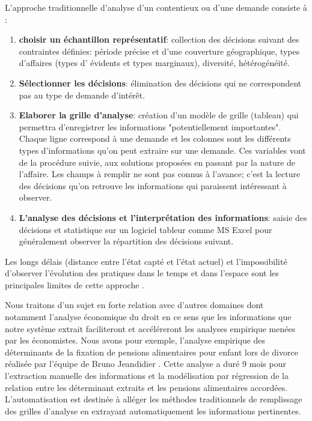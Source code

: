 L'approche traditionnelle d'analyse d'un contentieux ou d'une demande \citep{ancel2003expulsion} consiste à :
\begin{enumerate}
\item \textbf{choisir un échantillon représentatif}: collection des décisions suivant des contraintes définies:  période précise et d'une couverture géographique, types d'affaires (types d' évidents et types marginaux), diversité, hétérogénéité. 
\item \textbf{Sélectionner les décisions}: élimination des décisions qui ne correspondent pas au type de demande d'intérêt.
\item \textbf{Elaborer la grille d'analyse}: création d'un modèle de grille (tableau) qui permettra d'enregistrer les informations "potentiellement importantes". Chaque ligne correspond à une demande et les colonnes sont les différents types d'informations qu'on peut extraire sur une demande. Ces variables vont de la procédure suivie, aux solutions proposées en passant par la nature de l'affaire. Les champs à remplir ne sont pas connus à l'avance; c'est la lecture des décisions qu'on retrouve les informations qui paraissent intéressant à observer.
\item \textbf{L'analyse des décisions et l'interprétation des informations}: saisie des décisions et statistique sur un logiciel tableur comme MS Excel pour généralement observer la répartition des décisions suivant.
\end{enumerate}

Les longs délais (distance entre l'état capté et l'état actuel) et l'impossibilité d'observer l'évolution des pratiques dans le temps et dans l'espace sont les principales limites de cette approche \citep{ancel2003expulsion}.

Nous traitons d'un sujet en forte relation avec d'autres domaines dont notamment l'analyse économique du droit en ce sens que les informations que notre système extrait faciliteront et accéléreront les analyses empirique menées par les économistes. Nous avons pour exemple, l'analyse empirique des déterminants de la fixation de pensions alimentaires pour enfant lors de divorce réalisée par l'équipe de Bruno Jeandidier \citep{jeandidier2006pensions}. Cette analyse a duré 9 mois pour l'extraction manuelle des informations et la modélisation par régression de la relation entre les déterminant extraits et les pensions alimentaires accordées. L'automatisation est destinée à alléger les méthodes traditionnels de remplissage des grilles d'analyse en extrayant automatiquement les informations pertinentes.

